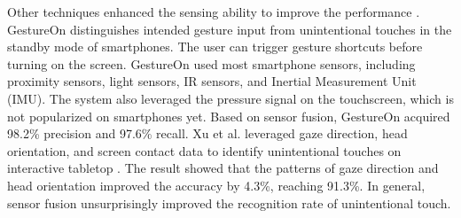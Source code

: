 Other techniques enhanced the sensing ability to improve the performance \cite{2015-GestureOn,2020-TabletopTouch,2001-PalmPressure,2019-BeyondUnint}.
GestureOn \cite{2015-GestureOn} distinguishes intended gesture input from unintentional touches in the standby mode of smartphones. The user can trigger gesture shortcuts before turning on the screen. GestureOn used most smartphone sensors, including proximity sensors, light sensors, IR sensors, and Inertial Measurement Unit (IMU). The system also leveraged the pressure signal on the touchscreen, which is not popularized on smartphones yet. Based on sensor fusion, GestureOn acquired 98.2\% precision and 97.6\% recall.
Xu et al. leveraged gaze direction, head orientation, and screen contact data to identify unintentional touches on interactive tabletop \cite{2020-TabletopTouch}. The result showed that the patterns of gaze direction and head orientation improved the accuracy by 4.3\%, reaching 91.3\%. In general, sensor fusion unsurprisingly improved the recognition rate of unintentional touch.


